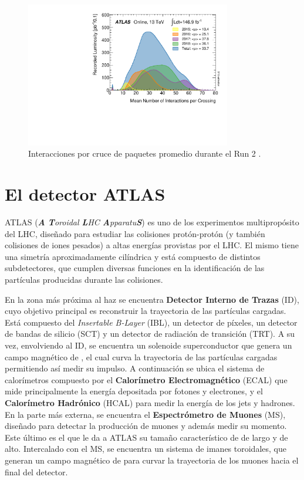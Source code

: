 \begin{figure}
  \centering
  \includegraphics[width=0.8\textwidth]{images/lhc/mu_2015_2018.pdf}
  \caption{Interacciones por cruce de paquetes promedio durante el Run 2 \cite{lumi_plot}.}
  \label{fig:pileup}
\end{figure}

\section{El detector ATLAS}


ATLAS (\textit{\textbf{A} \textbf{T}oroidal \textbf{L}HC \textbf{A}pparatu\textbf{S}})  \cite{PERF-2007-01} es uno de los experimentos multipropósito del LHC, diseñado para estudiar las colisiones protón-protón (y también colisiones de iones pesados) a altas energías provistas por el LHC. El mismo tiene una simetría aproximadamente cilíndrica y está compuesto de distintos subdetectores, que cumplen diversas funciones en la identificación de las partículas producidas durante las colisiones. 

En la zona más próxima al haz se encuentra \textbf{Detector Interno de Trazas} (ID), cuyo objetivo principal es reconstruir la trayectoria de las partículas cargadas. Está compuesto del \textit{Insertable B-Layer} (IBL), un detector de píxeles, un detector de bandas de silicio (SCT) y un detector de radiación de transición (TRT). A su vez, envolviendo al ID, se encuentra un solenoide superconductor que genera un campo magnético de , el cual curva la trayectoria de las partículas cargadas permitiendo así medir su impulso. A continuación se ubica el sistema de calorímetros compuesto por el \textbf{Calorímetro Electromagnético} (ECAL) que mide principalmente la energía depositada por fotones y electrones, y el \textbf{Calorímetro Hadrónico} (HCAL) para medir la energía de los jets y hadrones. En la parte más externa, se encuentra el \textbf{Espectrómetro de Muones} (MS), diseñado para detectar la producción de muones y además medir su momento. Este último es el que le da a ATLAS su tamaño característico de  de largo y  de alto. Intercalado con el MS, se encuentra un sistema de imanes toroidales, que generan un campo magnético de  para curvar la trayectoria de los muones hacia el final del detector.

